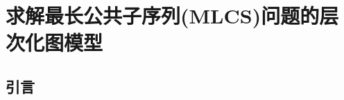 




\chapter{求解最长公共子序列(MLCS)问题的层次化图模型}
\label{chap:MLCS}

\section{引言}
\label{sec:4_introduction}

